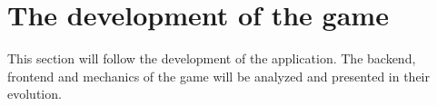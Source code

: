 \documentclass{article}
\begin{document}

\section{The development of the game}

This section will follow the development of the application. The backend,
frontend and mechanics of the game will be analyzed and presented in their
evolution. \newline
\end{document}
